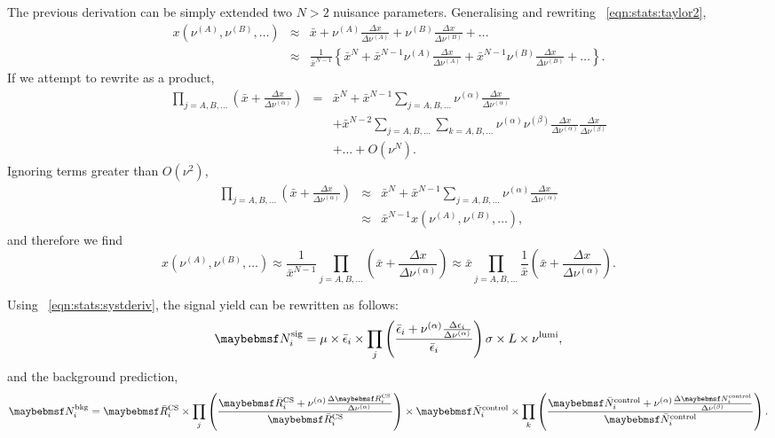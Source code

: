 The previous derivation can be simply extended two $N > 2$ nuisance
parameters. Generalising and rewriting \eqn~\ref{eqn:stats:taylor2},
\begin{eqnarray*}
x(\nu^{(A)}, \nu^{(B)}, \ldots) &\approx& \bar{x} +
\nu^{(A)}\frac{\Delta x}{\Delta\nu^{(A)}} +
\nu^{(B)}\frac{\Delta x}{\Delta\nu^{(B)}} + \ldots \\
&\approx& \frac{1}{\bar{x}^{N-1}} \left\{ \bar{x}^N +
\bar{x}^{N-1} \nu^{(A)}\frac{\Delta x}{\Delta\nu^{(A)}} +
\bar{x}^{N-1} \nu^{(B)}\frac{\Delta x}{\Delta\nu^{(B)}} + \ldots \right\}.
\end{eqnarray*}
If we attempt to rewrite as a product,
\begin{eqnarray*}
\prod_{j=A, B, \ldots} \left(\bar{x} + \frac{\Delta x}{\Delta\nu^{(\alpha)}}\right) &=&
\bar{x}^N + \bar{x}^{N-1} \sum_{j=A, B, \ldots} \nu^{(\alpha)}\frac{\Delta x}{\Delta \nu^{(\alpha)}} \\
&&+ \bar{x}^{N-2}\sum_{j=A, B, \ldots} \sum_{k=A, B, \ldots} \nu^{(\alpha)}\nu^{(\beta)}\frac{\Delta x}{\Delta
  \nu^{(\alpha)}}\frac{\Delta x}{\Delta \nu^{(\beta)}} \\
&&+ \ldots +O(\nu^N).
\end{eqnarray*}
Ignoring terms greater than $O(\nu^2)$,
\begin{eqnarray*}
\prod_{j=A, B, \ldots} \left(\bar{x} + \frac{\Delta x}{\Delta\nu^{(\alpha)}}\right) &\approx&
\bar{x}^N + \bar{x}^{N-1} \sum_{j=A, B, \ldots} \nu^{(\alpha)}\frac{\Delta x}{\Delta
  \nu^{(\alpha)}} \\
&\approx& \bar{x}^{N-1} x(\nu^{(A)}, \nu^{(B)}, \ldots),
\end{eqnarray*}
and therefore we find
\begin{equation}
\label{eqn:stats:systderiv}
x(\nu^{(A)}, \nu^{(B)}, \ldots) \approx \frac{1}{\bar{x}^{N-1}} \prod_{j = A, B,
  \ldots} \left(\bar{x} + \frac{\Delta x}{\Delta\nu^{(\alpha)}}\right) \approx
\bar{x} \prod_{j = A, B,
  \ldots} \frac{1}{\bar{x}}\left(\bar{x} + \frac{\Delta x}{\Delta\nu^{(\alpha)}}\right).
\end{equation}

Using \eqn~\ref{eqn:stats:systderiv}, the signal yield can be rewritten as follows:
\begin{equation*}
\NSigi = \mu \times \bar{\epsilon}_i \times \prod_{j}\left(\frac{\bar{\epsilon}_i
    + \nu^{(\alpha)}\frac{\Delta\epsilon_i}{\Delta\nu^{(\alpha)}}}{\bar{\epsilon}_i}\right) \sigma \times L \times \nu^{\textrm{lumi}},
\end{equation*}
and the background prediction,
\begin{equation*}
\NBkgi = \RbarCS_i \times \prod_{j}\left( \frac{\RbarCS_i
    + \nu^{(\alpha)}\frac{\Delta\RCSi}{\Delta\nu^{(\alpha)}}}{\RbarCS_i}\right)
\times \NbarControl_i \times \prod_{k}\left( \frac{\NbarControl_i
    + \nu^{(\alpha)}\frac{\Delta\NControli}{\Delta\nu^{(\beta)}}}{\NbarControl_i}\right).
\end{equation*}

